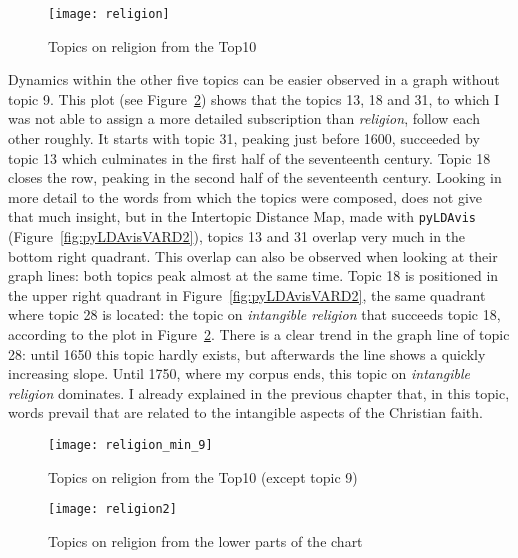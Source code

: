 \begin{figure}[hbt!]
	\centering
	\texttt{[image: religion]}
	\caption{Topics on religion from the Top10}
	\label{fig:religion}
\end{figure}

Dynamics within the other five topics can be easier observed in a graph without topic 9. This plot (see Figure~\ref{fig:religion_min_9}) shows that the topics 13, 18 and 31, to which I was not able to assign a more detailed subscription than \textit{religion}, follow each other roughly. It starts with topic 31, peaking just before 1600, succeeded by topic 13 which culminates in the first half of the seventeenth century. Topic 18 closes the row, peaking in the second half of the seventeenth century. Looking in more detail to the words from which the topics were composed, does not give that much insight, but in the Intertopic Distance Map, made with \texttt{pyLDAvis} (Figure~\ref{fig:pyLDAvisVARD2}), topics 13 and 31 overlap very much in the bottom right quadrant. This overlap can also be observed when looking at their graph lines: both topics peak almost at the same time. Topic 18 is positioned in the upper right quadrant in Figure~\ref{fig:pyLDAvisVARD2}, the same quadrant where topic 28 is located: the topic on \textit{intangible religion} that succeeds topic 18, according to the plot in Figure~\ref{fig:religion_min_9}. There is a clear trend in the graph line of topic 28: until 1650 this topic hardly exists, but afterwards the line shows a quickly increasing slope. Until 1750, where my corpus ends, this topic on \textit{intangible religion} dominates. I already explained in the previous chapter that, in this topic, words prevail that are related to the intangible aspects of the Christian faith.

\begin{figure}[hbt!]
	\centering
	\texttt{[image: religion\_min\_9]}
	\caption{Topics on religion from the Top10 (except topic 9)}
	\label{fig:religion_min_9}
\end{figure}

\begin{figure}[hbt!]
	\centering
	\texttt{[image: religion2]}
	\caption{Topics on religion from the lower parts of the chart}
	\label{fig:religion2}
\end{figure}

